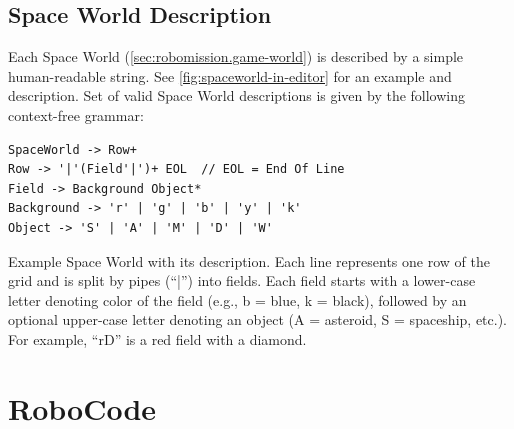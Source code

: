 \subsection{Space World Description}
\label{sec:impl.spaceworld}

Each Space World (\cref{sec:robomission.game-world}) is described by a simple
human-readable string.
See \cref{fig:spaceworld-in-editor} for an example and description.
Set of valid Space World descriptions is given by the
following context-free grammar:

\begin{lstlisting}
SpaceWorld -> Row+
Row -> '|'(Field'|')+ EOL  // EOL = End Of Line
Field -> Background Object*
Background -> 'r' | 'g' | 'b' | 'y' | 'k'
Object -> 'S' | 'A' | 'M' | 'D' | 'W'
\end{lstlisting}




%
{Example Space World with its description. %
Each line represents one row of the grid
and is split by pipes (``|'') into fields.
Each field starts with a lower-case letter denoting color of the field
(e.g., b = blue, k = black),
followed by an optional upper-case letter denoting an object
(A = asteroid, S = spaceship, etc.).
For example, ``rD'' is a red field with a diamond.}



\section{RoboCode}
\label{sec:robocode}

